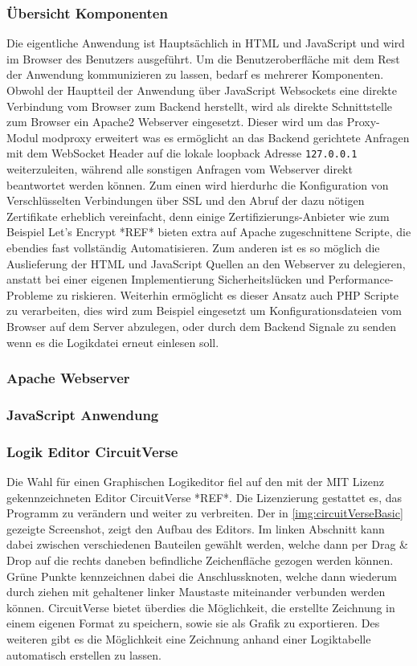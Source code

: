 \subsubsection{Übersicht Komponenten}
Die eigentliche Anwendung ist Hauptsächlich in HTML und JavaScript und wird im Browser des Benutzers ausgeführt. Um die Benutzeroberfläche mit dem Rest der Anwendung kommunizieren zu lassen, bedarf es mehrerer Komponenten. Obwohl der Hauptteil der Anwendung über JavaScript Websockets eine direkte Verbindung vom Browser zum Backend herstellt, wird als direkte Schnittstelle zum Browser ein Apache2 Webserver eingesetzt. Dieser wird um das Proxy-Modul modproxy erweitert was es ermöglicht an das Backend gerichtete Anfragen mit dem WebSocket Header auf die lokale loopback Adresse \texttt{127.0.0.1} weiterzuleiten, während alle sonstigen Anfragen vom Webserver direkt beantwortet werden können. Zum einen wird hierdurhc die Konfiguration von Verschlüsselten Verbindungen über SSL und den Abruf der dazu nötigen Zertifikate erheblich vereinfacht, denn einige Zertifizierungs-Anbieter wie zum Beispiel Let's Encrypt *REF* bieten extra auf Apache zugeschnittene Scripte, die ebendies fast vollständig Automatisieren. Zum anderen ist es so möglich die Auslieferung der HTML und JavaScript Quellen an den Webserver zu delegieren, anstatt bei einer eigenen Implementierung Sicherheitslücken und Performance-Probleme zu riskieren. Weiterhin ermöglicht es dieser Ansatz auch PHP Scripte zu verarbeiten, dies wird zum Beispiel eingesetzt um Konfigurationsdateien vom Browser auf dem Server abzulegen, oder durch dem Backend Signale zu senden wenn es die Logikdatei erneut einlesen soll.
\subsubsection{Apache Webserver}

\subsubsection{JavaScript Anwendung}
\subsubsection{Logik Editor CircuitVerse}\label{kap:circuitVerse}
Die Wahl für einen Graphischen Logikeditor fiel auf den mit der MIT Lizenz gekennzeichneten Editor CircuitVerse *REF*. Die Lizenzierung gestattet es, das Programm zu verändern und weiter zu verbreiten. Der in \autoref{img:circuitVerseBasic} gezeigte Screenshot, zeigt den Aufbau des Editors. Im linken Abschnitt kann dabei zwischen verschiedenen Bauteilen gewählt werden, welche dann per Drag \& Drop auf die rechts daneben befindliche Zeichenfläche gezogen werden können. Grüne Punkte kennzeichnen dabei die Anschlussknoten, welche dann wiederum durch ziehen mit gehaltener linker Maustaste miteinander verbunden werden können. CircuitVerse bietet überdies die Möglichkeit, die erstellte Zeichnung in einem eigenen Format zu  speichern, sowie sie als Grafik zu exportieren. Des weiteren gibt es die Möglichkeit eine Zeichnung anhand einer Logiktabelle automatisch erstellen zu lassen. 

